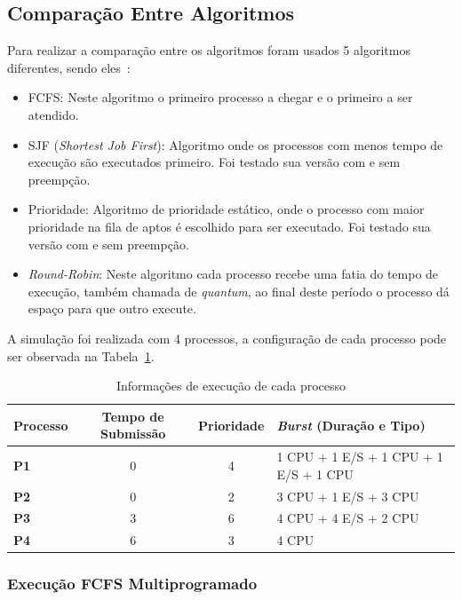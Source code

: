 \documentclass[
	12pt,				%
	oneside,   	        %
	a4paper,			%
	english,			%
	french,				%
	spanish,			%
	brazil,				%
	]{pacotes/abntex2}
\begin{document}
\subsection{Comparação Entre Algoritmos}
\label{subsec:algoritmos}

Para realizar a comparação entre os algoritmos foram usados 5 algoritmos diferentes, sendo eles~\cite{maziero2019}:

\begin{itemize}
  \item FCFS: Neste algoritmo o primeiro processo a chegar e o primeiro a ser atendido.
  \item SJF (\textit{Shortest Job First}): Algoritmo onde os processos com menos tempo de execução são executados primeiro. Foi testado sua versão com e sem preempção.
  \item Prioridade: Algoritmo de prioridade estático, onde o processo com maior prioridade na fila de aptos é escolhido para ser executado. Foi testado sua versão com e sem preempção.
  \item \textit{Round-Robin}: Neste algoritmo cada processo recebe uma fatia do tempo de execução, também chamada de \textit{quantum}, ao final deste período o processo dá espaço para que outro execute.
\end{itemize}

A simulação foi realizada com 4 processos, a configuração de cada processo pode ser observada na Tabela~\ref{table:processos}.

\begin{table}[H]
\centering
\caption{Informações de execução de cada processo}
\label{table:processos}
\footnotesize
\begin{tabular}{l|c|c|l}
\toprule
\textbf{Processo} & \textbf{Tempo de Submissão} & \textbf{Prioridade} & \textbf{\textit{Burst} (Duração e Tipo)} \\ 
\midrule
\textbf{P1} & 0  & 4 & 1 CPU + 1 E/S + 1 CPU + 1 E/S + 1 CPU \\
\textbf{P2} & 0  & 2 & 3 CPU + 1 E/S + 3 CPU \\
\textbf{P3} & 3  & 6 & 4 CPU + 4 E/S + 2 CPU \\
\textbf{P4} & 6  & 3 & 4 CPU \\
\bottomrule
\end{tabular}
\end{table}

\subsubsection{Execução FCFS Multiprogramado}
\label{subsubsec:fcfs_multi}
\end{document}

